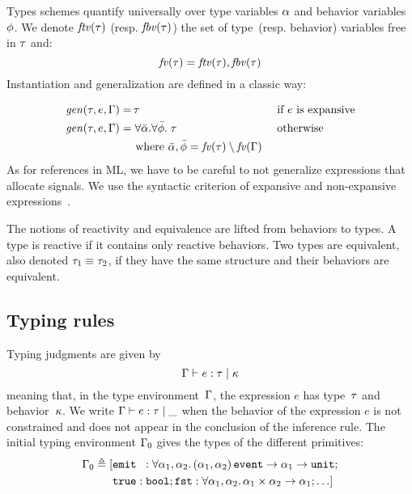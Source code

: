 \documentclass[9pt]{sigplanconf}
\newcommand{\deq}{\triangleq}
\begin{document}
Types schemes quantify universally over type variables $\alpha$ and behavior variables $\phi$. We denote $\mathit{ftv}(\tau)$ (resp. $\mathit{fbv}(\tau)$) the set of type~(resp. behavior) variables free in $\tau$ and:
\[ \mathit{fv}(\tau) = \mathit{ftv}(\tau), \mathit{fbv}(\tau) \] 
Instantiation and generalization are defined in a classic way:
\vspace{-1.3em}
\begin{align*}
\mathit{gen}(\tau, e, \Gamma) = &\, \tau && \text { if $e$ is expansive} \\
\mathit{gen}(\tau, e, \Gamma) = &\; \forall \bar{\alpha}.\forall \bar{\phi}.\; \tau  && \text{ otherwise } \\
  & \text{ where }  \bar{\alpha}, \bar{\phi} = \mathit{fv}(\tau) \setminus \mathit{fv}(\Gamma)  
\end{align*}
As for references in ML, we have to be careful to not generalize expressions that allocate signals. We use the syntactic criterion of expansive and non-expansive expressions~\cite{Tofte:1990}.

The notions of reactivity and equivalence are lifted from behaviors to types. A type is reactive if it contains only reactive behaviors. Two types are equivalent, also denoted $\tau_1 \equiv \tau_2$, if they have the same structure and their behaviors are equivalent.

\subsection{Typing rules}

Typing judgments are given by 
\[ \Gamma \vdash e : \tau \mid \kappa \] 
meaning that, in the type environment~$\Gamma$, the expression $e$ has type~$\tau$ and behavior~$\kappa$. We write $\Gamma \vdash e : \tau \mid \_$ when the behavior of the expression $e$ is not constrained and does not appear in the conclusion of the inference rule. The initial typing environment $\Gamma_0$ gives the types of the different primitives: 
\begin{align*}
\Gamma_0 \deq [
 &\eemit{}{} : \forall  \rtvar_1, \rtvar_2. \, 
        \rtarrow{ \rtsig{\rtvar_1}{\rtvar_2} }{\rtarrow{\rtvar_1}{\unit{}} }; \\
        &\mathtt{true} : \mathtt{bool};
              \mathtt{fst} : \forall \rtvar_1, \rtvar_2.\, \rtarrow{\rtprod{\rtvar_1}{\rtvar_2}}{\rtvar_1};  \ldots ]
\end{align*}
\end{document}
